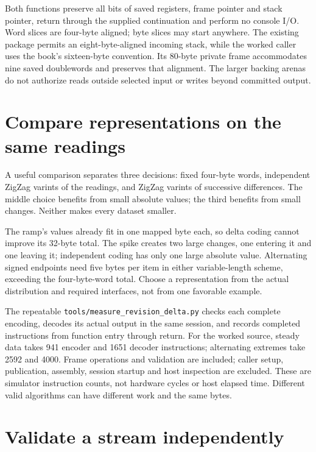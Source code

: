 Both functions preserve all bits of saved registers, frame pointer and stack
pointer, return through the supplied continuation and perform no console I/O.
Word slices are four-byte aligned; byte slices may start anywhere. The existing
package permits an eight-byte-aligned incoming stack, while the worked caller
uses the book's sixteen-byte convention. Its 80-byte private frame accommodates
nine saved doublewords and preserves that alignment. The larger backing arenas
do not authorize reads outside selected input or writes beyond committed output.

\section{Compare representations on the same readings}

A useful comparison separates three decisions: fixed four-byte words, independent
ZigZag varints of the readings, and ZigZag varints of successive differences.
The middle choice benefits from small absolute values; the third benefits from
small changes. Neither makes every dataset smaller.



The ramp's values already fit in one mapped byte each, so delta coding cannot
improve its 32-byte total. The spike creates two large changes, one entering it
and one leaving it; independent coding has only one large absolute value.
Alternating signed endpoints need five bytes per item in either variable-length
scheme, exceeding the four-byte-word total. Choose a representation from the
actual distribution and required interfaces, not from one favorable example.

The repeatable \texttt{tools/measure\_revision\_delta.py} checks each complete
encoding, decodes its actual output in the same session, and records completed
instructions from function entry through return. For the worked source, steady
data takes 941 encoder and 1651 decoder instructions; alternating extremes take
2592 and 4000. Frame operations and validation are included; caller setup,
publication, assembly, session startup and host inspection are excluded. These
are simulator instruction counts, not hardware cycles or host elapsed time.
Different valid algorithms can have different work and the same bytes.

\section{Validate a stream independently}

